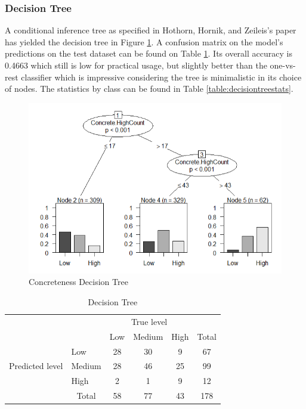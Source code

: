 \documentclass[12pt, a4paper]{article}
\begin{document}
\subsubsection{Decision Tree}

A conditional inference tree as specified in Hothorn, Hornik, and Zeileis's paper \cite{ctree} has yielded the decision tree in Figure \ref{decision_tree}. A confusion matrix on the model's predictions on the test dataset can be found on Table \ref{table:decision_tree}. Its overall accuracy is 0.4663 which still is low for practical usage, but slightly better than the one-vs-rest classifier which is impressive considering the tree is minimalistic in its choice of nodes. The statistics by class can be found in Table \ref{table:decisiontreestats}. 

\begin{figure}[ht]
\centerline{\includegraphics[scale=0.8]{decision_tree.png}}
\caption{Concreteness Decision Tree}
\label{decision_tree}
\end{figure}

\begin{table}[ht]
\centering
\begin{tabular}{l|l|c|c|c|c}
\multicolumn{2}{c}{}&\multicolumn{3}{c}{True level}&\\
\cline{3-5}
\multicolumn{2}{c|}{}&Low&Medium&High&\multicolumn{1}{c}{Total}\\
\cline{2-5}
\multirow{3}{*}{Predicted level}& Low & 28 & 30 & 9 & 67\\
\cline{2-5}
& Medium & 28 & 46 & 25 & 99\\
\cline{2-5}
& High & 2 & 1 & 9 & 12\\
\cline{2-5}
\multicolumn{1}{c}{} & \multicolumn{1}{c}{Total} & \multicolumn{1}{c}{58} & \multicolumn{    1}{c}{77} & \multicolumn{    1}{c}{43} & \multicolumn{1}{c}{178}\\
\end{tabular}
\caption{Decision Tree}
\label{table:decision_tree}
\end{table}
\end{document}
